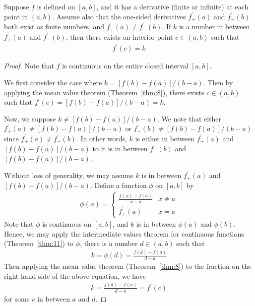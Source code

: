 \documentclass[thmcnt=section, 12pt]{my-elegantbook}
\begin{document}
\begin{theorem}[Darboux] \label{thm:12}
    Suppose $f$ is defined on $[a, b]$, and it has a derivative (finite or infinite) at each point in $(a, b)$. Assume also that the one-sided derivatives $f^\prime_{+}(a)$ and $f^\prime_{-}(b)$ both exist as finite numbers, and $f^\prime_{+}(a) \neq f^\prime_{-}(b)$. If $k$ is a number in between $f^\prime_{+}(a)$ and $f^\prime_{-}(b)$, then there exists an interior point $c \in (a, b)$ such that 
    \begin{align*}
        f^\prime(c) = k
    \end{align*}
\end{theorem}

\begin{proof}
    Note that $f$ is continuous on the entire closed interval $[a, b]$.

    \par We first consider the case where $k = [f(b) - f(a)] / (b-a)$. Then by applying the mean value theorem (Theorem~\ref{thm:8}), there exists $c \in (a, b)$ such that $f^\prime(c) = [f(b) - f(a)] / (b-a) = k$.

    \par Now, we suppose $k \neq [f(b) - f(a)] / (b-a)$. We note that either $f^\prime_{+}(a) \neq [f(b) - f(a)] / (b-a)$ or $f^\prime_{-}(b) \neq [f(b) - f(a)] / (b-a)$ since $f^\prime_{+}(a) \neq f^\prime_{-}(b)$. In other words, $k$ is either in between $f^\prime_{+}(a)$ and $[f(b) - f(a)] / (b-a)$ to it is in between $f^\prime_{-}(b)$ and $[f(b) - f(a)] / (b-a)$.

    \par Without loss of generality, we may assume $k$ is in between $f^\prime_{+}(a)$ and $[f(b) - f(a)] / (b-a)$. Define a function $\phi$ on $[a, b]$ by
    \begin{align*}
        \phi(x) = \begin{cases}
            \frac{f(x) - f(a)}{x - a}
            &x \neq a \\ 
            f^\prime_{+}(a)
            &x = a
        \end{cases}
    \end{align*}
    Note that $\phi$ is continuous on $[a, b]$, and $k$ is in between $\phi(a)$ and $\phi(b)$. Hence, we may apply the intermediate values theorem for continuous functions (Theorem~\ref{thm:11}) to $\phi$, there is a number $d \in (a, b)$ such that 
    \begin{align*}
        k = \phi(d) = \frac{f(d) - f(a)}{d - a}
    \end{align*}
    Then applying the mean value theorem (Theorem~\ref{thm:8}) to the fraction on the right-hand side of the above equation, we have 
    \begin{align*}
        k = \frac{f(d) - f(a)}{d - a}
        = f^\prime(c)
    \end{align*}
    for some $c$ in between $a$ and $d$.


\end{proof}
\end{document}

